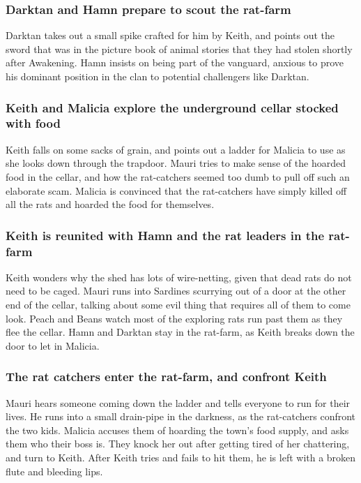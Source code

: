 \subsubsection{\Gls{Darktan} and \Gls{Hamn} prepare to scout the rat-farm}
\Gls{Darktan} takes out a small spike crafted for him by \Gls{Keith}, and points out the sword that
was in the picture book of animal stories that they had stolen shortly after Awakening. \Gls{Hamn}
insists on being part of the vanguard, anxious to prove his dominant position in the clan to
potential challengers like \Gls{Darktan}.

\subsubsection{\Gls{Keith} and \Gls{Malicia} explore the underground cellar stocked with food}
\Gls{Keith} falls on some sacks of grain, and points out a ladder for \Gls{Malicia} to use as she
looks down through the trapdoor. \Gls{Mauri} tries to make sense of the hoarded food in the cellar,
and how the rat-catchers seemed too dumb to pull off such an elaborate scam. \Gls{Malicia} is
convinced that the rat-catchers have simply killed off all the rats and hoarded the food for
themselves.

\subsubsection{\Gls{Keith} is reunited with \Gls{Hamn} and the rat leaders in the rat-farm}
\Gls{Keith} wonders why the shed has lots of wire-netting, given that dead rats do not need to be
caged. \Gls{Mauri} runs into \Gls{Sardines} scurrying out of a door at the other end of the cellar,
talking about some evil thing that requires all of them to come look. \Gls{Peach} and \Gls{Beans}
watch most of the exploring rats run past them as they flee the cellar. \Gls{Hamn} and \Gls{Darktan}
stay in the rat-farm, as \Gls{Keith} breaks down the door to let in \Gls{Malicia}.

\subsubsection{The rat catchers enter the rat-farm, and confront \Gls{Keith}}
\Gls{Mauri} hears someone coming down the ladder and tells everyone to run for their lives. He
runs into a small drain-pipe in the darkness, as the rat-catchers confront the two kids.
\Gls{Malicia} accuses them of hoarding the town's food supply, and asks them who their boss is. They
knock her out after getting tired of her chattering, and turn to \Gls{Keith}. After \Gls{Keith}
tries and fails to hit them, he is left with a broken flute and bleeding lips.

